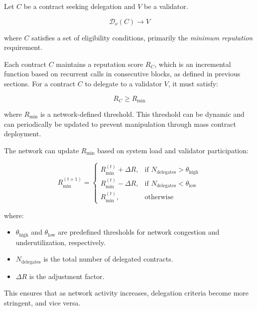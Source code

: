 \documentclass{article}
\begin{document}
Let \( C \) be a contract seeking delegation and \( V \) be a validator. 

\begin{equation}
    \mathcal{D}_\nu(C) \to V
\end{equation}

where \( C \) satisfies a set of eligibility conditions, primarily the \textit{minimum reputation} requirement.

Each contract \( C \) maintains a reputation score \( R_C \), which is an incremental function based on recurrent calls in consecutive blocks, as defined in previous sections. For a contract \( C \) to delegate to a validator \( V \), it must satisfy:

\begin{equation}
    R_C \geq R_{\text{min}}
\end{equation}

where \( R_{\text{min}} \) is a network-defined threshold. This threshold can be dynamic and can periodically be updated to prevent manipulation through mass contract deployment.

The network can update \( R_{\text{min}} \) based on system load and validator participation:

\begin{equation}
    R_{\text{min}}^{(t+1)} = 
    \begin{cases}
        R_{\text{min}}^{(t)} + \Delta R, & \text{if } N_{\text{delegates}} > \theta_{\text{high}} \\
        R_{\text{min}}^{(t)} - \Delta R, & \text{if } N_{\text{delegates}} < \theta_{\text{low}} \\
        R_{\text{min}}^{(t)}, & \text{otherwise}
    \end{cases}
\end{equation}

where:
\begin{itemize}
    \item \( \theta_{\text{high}} \) and \( \theta_{\text{low}} \) are predefined thresholds for network congestion and underutilization, respectively.
    \item \( N_{\text{delegates}} \) is the total number of delegated contracts.
    \item \( \Delta R \) is the adjustment factor.
\end{itemize}

This ensures that as network activity increases, delegation criteria become more stringent, and vice versa.
\end{document}
